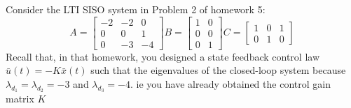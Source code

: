 \item Consider the LTI SISO system in Problem 2 of homework 5:
  \begin{equation}
    A =
    \begin{bmatrix}
      -2 & -2 & 0 \\
      0 & 0 & 1 \\
      0 & -3 & -4 
    \end{bmatrix}
    B =
    \begin{bmatrix}
      1 & 0 \\
      0 & 0 \\
      0 & 1
    \end{bmatrix}
    C =
    \begin{bmatrix}
      1 & 0 & 1 \\
      0 & 1 & 0
    \end{bmatrix}
  \end{equation}
  Recall that, in that homework, you designed a state feedback control law $\bar u(t) = -K\bar x(t)$ such that
  the eigenvalues of the closed-loop system because $\lambda_{d_1} = \lambda_{d_2} = -3$ and $\lambda_{d_3} = -4$.
  ie you have already obtained the control gain matrix $K$
